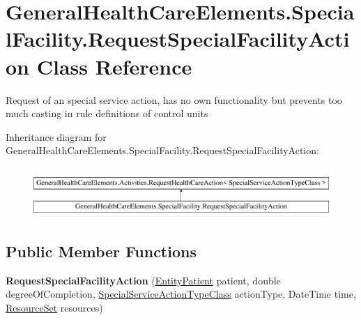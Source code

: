 \hypertarget{class_general_health_care_elements_1_1_special_facility_1_1_request_special_facility_action}{}\section{General\+Health\+Care\+Elements.\+Special\+Facility.\+Request\+Special\+Facility\+Action Class Reference}
\label{class_general_health_care_elements_1_1_special_facility_1_1_request_special_facility_action}


Request of an special service action, has no own functionality but prevents too much casting in rule definitions of control units  


Inheritance diagram for General\+Health\+Care\+Elements.\+Special\+Facility.\+Request\+Special\+Facility\+Action\+:\begin{figure}[H]
\begin{center}
\leavevmode
\includegraphics[height=1.908007cm]{class_general_health_care_elements_1_1_special_facility_1_1_request_special_facility_action}
\end{center}
\end{figure}
\subsection*{Public Member Functions}
\begin{DoxyCompactItemize}
\item 
{\bfseries Request\+Special\+Facility\+Action} (\hyperlink{class_general_health_care_elements_1_1_entities_1_1_entity_patient}{Entity\+Patient} patient, double degree\+Of\+Completion, \hyperlink{class_general_health_care_elements_1_1_general_classes_1_1_action_types_and_paths_1_1_special_service_action_type_class}{Special\+Service\+Action\+Type\+Class} action\+Type, Date\+Time time, \hyperlink{class_general_health_care_elements_1_1_resource_handling_1_1_resource_set}{Resource\+Set} resources)\hypertarget{class_general_health_care_elements_1_1_special_facility_1_1_request_special_facility_action_a5f5abac9230bf1ccc97a5fb52f2385fe}{}\label{class_general_health_care_elements_1_1_special_facility_1_1_request_special_facility_action_a5f5abac9230bf1ccc97a5fb52f2385fe}

\end{DoxyCompactItemize}
